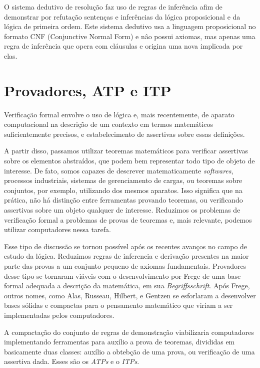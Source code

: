  O sistema dedutivo de resolução faz uso de regras de inferência afim de demonstrar por refutação sentenças e inferências da lógica proposicional e da lógica de primeira ordem.
Este sistema dedutivo usa a linguagem proposicional no formato CNF (Conjunctive Normal Form) e nâo possui axiomas, mas apenas uma regra de inferência que opera com cláusulas e origina uma nova implicada por elas.


\section{Provadores, ATP e ITP}

Verificação formal envolve o uso de lógica e, mais recentemente, de aparato computacional na descrição de um contexto em termos matemáticos suficientemente precisos, e estabelecimento de assertivas sobre essas definições.

A partir disso, passamos utilizar teoremas matemáticos para verificar assertivas sobre os elementos abstraídos, que podem bem representar todo tipo de objeto de interesse.
De fato, somos capazes de descrever matematicamente \textit{softwares}, processos industriais, sistemas de gerenciamento de cargas, ou teoremas sobre conjuntos, por exemplo, utilizando dos mesmos aparatos.
Isso significa que na prática, não há distinção entre ferramentas provando teoremas, ou verificando assertivas sobre um objeto qualquer de interesse.
Reduzimos os problemas de verificação formal a problemas de provas de teoremas e, mais relevante, podemos utilizar computadores nessa tarefa.

Esse tipo de discussão se tornou possível após os recentes avanços no campo de estudo da lógica.
Reduzimos regras de inferencia e derivação presentes na maior parte das provas a um conjunto pequeno de axiomas fundamentais.
Provadores desse tipo se tornaram viáveis com o desenvolvimento por Frege de uma base formal adequada a descrição da matemática, em sua \textit{Begriffsschrift}.
Após Frege, outros nomes, como Alas, Russeau, Hilbert, e Gentzen se esforlaram a desenvolver bases sólidas e compactas para o pensamento matemático que viriam a ser implementadas pelos computadores.

A compactação do conjunto de regras de demonstração viabilizaria computadores implementando ferramentas para auxílio a prova de teoremas, divididas em basicamente duas classes: auxílio a obtebção de uma prova, ou verificação de uma assertiva dada. Esses são os \textit{ATPs} e o \textit{ITPs}.

